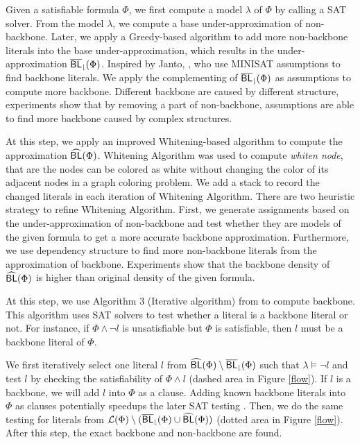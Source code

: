 \medskip
{}
Given a satisfiable formula $\Phi$, we first compute a model $\lambda$ of $\Phi$ by calling a SAT solver.
From the model $\lambda$, we compute a base under-approximation of non-backbone.
Later, we apply a Greedy-based algorithm to add more non-backbone literals into the base under-approximation, which results in the
under-approximation ${\sf \overline{BL}_\downharpoonright}(\Phi)$. Inspired by Janto, \cite{JLM15}, who use MINISAT assumptions to find backbone literals. We apply the complementing of ${\sf \overline{BL}_\downharpoonright}(\Phi)$ as assumptions to compute more backbone. Different backbone are caused by different structure, experiments show that by removing a part of non-backbone, assumptions are able to find more backbone caused by complex structures.



\medskip
{}
At this step, we apply an improved Whitening-based algorithm to compute the approximation ${\sf \widehat{BL}}(\Phi)$.
Whitening Algorithm was used to compute \emph{whiten node}, that are the nodes can be colored as white without changing the color of its adjacent nodes in a graph coloring problem.
We add a stack to record the changed literals in each iteration of Whitening Algorithm. There are two heuristic strategy to refine Whitening Algorithm.
First, we generate assignments based on the under-approximation of non-backbone and test whether they are models of the given formula to get a more accurate backbone approximation.
Furthermore, we use dependency structure to find more non-backbone literals from the approximation of backbone.
Experiments show that the backbone density of ${\sf \widehat{BL}}(\Phi)$ is higher than original density of the given formula.

\medskip
{}
At this step, we use Algorithm 3 (Iterative algorithm) from \cite{JLM15} to compute backbone.
This algorithm uses SAT solvers to test whether a literal is a backbone literal or not.
For instance, if $\Phi\wedge \neg l$ is unsatisfiable but $\Phi$ is satisfiable, then $l$ must be a backbone literal of $\Phi$.

We first iteratively select one literal $l$ from ${\sf \widehat{BL}}(\Phi)\setminus {\sf \overline{BL}_\downharpoonright}(\Phi)$ such that $\lambda \models \neg l$ and test $l$ by checking the satisfiability of $\Phi\wedge l$ (dashed area in Figure \ref{flow}).
If $l$ is a backbone, we will add $l$ into $\Phi$ as a clause. Adding known backbone literals into $\Phi$ as clauses potentially speedups the later SAT testing \cite{JLM15,MPA2015}.
Then, we do the same testing for literals from ${\cal L}(\Phi)\setminus ({\sf \overline{BL}_\downharpoonright}(\Phi)\cup{\sf \widehat{BL}}(\Phi))$ (dotted area in Figure \ref{flow}).
After this step, the exact backbone and non-backbone are found.



